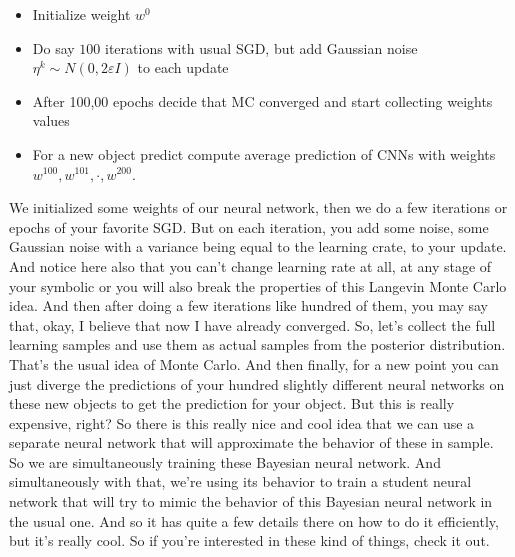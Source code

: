 \documentclass[11pt, oneside, reqno]{amsart}
\numberwithin{equation}{section}
\theoremstyle{plain}%
\theoremstyle{definition}
\theoremstyle{remark}
\begin{document}
\begin{itemize}
	\item Initialize weight $w^0$
	\item Do say $100$ iterations with usual SGD, but add Gaussian noise $\eta^k\sim N(0,2\varepsilon I)$ to each update
	\item After 100,00 epochs decide that MC converged and start collecting weights values
	\item For a new object predict compute average prediction of CNNs with weights $w^{100}, w^{101},\cdot,w^{200}$.
\end{itemize}

 We initialized some weights of our neural network, then we do a few iterations or epochs of your favorite SGD. But on each iteration, you add some noise, some Gaussian noise with a variance being equal to the learning crate, to your update. And notice here also that you can't change learning rate at all, at any stage of your symbolic or you will also break the properties of this Langevin Monte Carlo idea. And then after doing a few iterations like hundred of them, you may say that, okay, I believe that now I have already converged. So, let's collect the full learning samples and use them as actual samples from the posterior distribution. That's the usual idea of Monte Carlo. And then finally, for a new point you can just diverge the predictions of your hundred slightly different neural networks on these new objects to get the prediction for your object. But this is really expensive, right? So there is this really nice and cool idea that we can use a separate neural network that will approximate the behavior of these in sample. So we are simultaneously training these Bayesian neural network. And simultaneously with that, we're using its behavior to train a student neural network that will try to mimic the behavior of this Bayesian neural network in the usual one. And so it has quite a few details there on how to do it efficiently, but it's really cool. So if you're interested in these kind of things, check it out.
\end{document}
